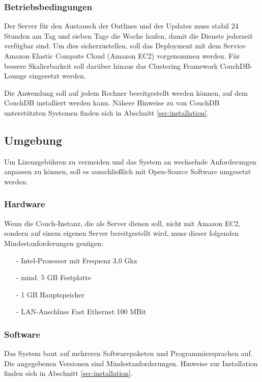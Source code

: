 \subsubsection{Betriebsbedingungen}

Der Server für den Austausch der Outlines und der Updates muss stabil 24 Stunden am Tag und sieben Tage die Woche laufen, damit die Dienste jederzeit verfügbar sind. Um dies sicherzustellen, soll das Deployment mit dem Service Amazon Elastic Compute Cloud (Amazon EC2) vorgenommen werden. Für bessere Skalierbarkeit soll darüber hinaus das Clustering Framework CouchDB-Lounge eingesetzt werden.

Die Anwendung soll auf jedem Rechner bereitgestellt werden können, auf dem CouchDB installiert werden kann. Nähere Hinweise zu von CouchDB unterstützten Systemen finden sich in Abschnitt \ref{sec:installation}.

\subsection{Umgebung}

Um Lizenzgebühren zu vermeiden und das System an wechselnde Anforderungen anpassen zu können, soll es ausschließlich mit Open-Source Software umgesetzt werden. 


\subsubsection{Hardware}

Wenn die Couch-Instanz, die als Server dienen soll, nicht mit Amazon EC2, sondern auf einem eigenen Server bereitgestellt wird, muss dieser folgenden Mindestanforderungen genügen:

\begin{itemize}  
  \item[-] Intel-Prozessor mit Frequenz 3,0 Ghz
  \item[-] mind. 5 GB Festplatte 
  \item[-] 1 GB Hauptspeicher 
  \item[-] LAN-Anschluss Fast Ethernet 100 MBit
\end{itemize}


\subsubsection{Software}

Das System baut auf mehreren Softwarepaketen und Programmiersprachen auf. Die angegebenen Versionen sind Mindestanforderungen. Hinweise zur Installation finden sich in Abschnitt \ref{sec:installation}.

